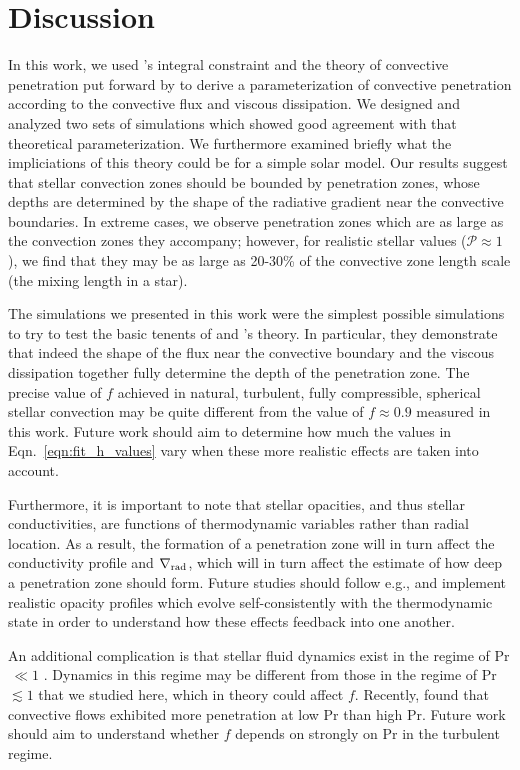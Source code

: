 \documentclass{aastex631}
\newcommand{\gradrad}{\ensuremath{\nabla_{\rm{rad}}}}
\newcommand{\mP}{\ensuremath{\mathcal{P}}}
\newcommand\Pran{\ensuremath{\mathrm{Pr}}}
\begin{document}
\section{Discussion}
\label{sec:discussion}
In this work, we used \citet{roxburgh1989}'s integral constraint and the theory of convective penetration put forward by \citet{zahn1991} to derive a parameterization of convective penetration according to the convective flux and viscous dissipation.
We designed and analyzed two sets of simulations which showed good agreement with that theoretical parameterization.
We furthermore examined briefly what the impliciations of this theory could be for a simple solar model.
Our results suggest that stellar convection zones should be bounded by penetration zones, whose depths are determined by the shape of the radiative gradient near the convective boundaries.
In extreme cases, we observe penetration zones which are as large as the convection zones they accompany; however, for realistic stellar values ($\mP \approx 1$), we find that they may be as large as 20-30\% of the convective zone length scale (the mixing length in a star).

The simulations we presented in this work were the simplest possible simulations to try to test the basic tenents of \citet{roxburgh1989} and \citet{zahn1991}'s theory.
In particular, they demonstrate that indeed the shape of the flux near the convective boundary and the viscous dissipation together fully determine the depth of the penetration zone.
The precise value of $f$ achieved in natural, turbulent, fully compressible, spherical stellar convection may be quite different from the value of $f \approx 0.9$ measured in this work.
Future work should aim to determine how much the values in Eqn.~\ref{eqn:fit_h_values} vary when these more realistic effects are taken into account.

Furthermore, it is important to note that stellar opacities, and thus stellar conductivities, are functions of thermodynamic variables rather than radial location.
As a result, the formation of a penetration zone will in turn affect the conductivity profile and $\gradrad$, which will in turn affect the estimate of how deep a penetration zone should form.
Future studies should follow e.g., \citet{kapyla_etal_2017} and implement realistic opacity profiles which evolve self-consistently with the thermodynamic state in order to understand how these effects feedback into one another.

An additional complication is that stellar fluid dynamics exist in the regime of Pr$\,\ll1$ \citep{garaud2021}.
Dynamics in this regime may be different from those in the regime of Pr $\lesssim 1$ that we studied here, which in theory could affect $f$.
Recently, \citet{kapyla2021} found that convective flows exhibited more penetration at low Pr than high Pr.
Future work should aim to understand whether $f$ depends on strongly on $\Pran$ in the turbulent regime.
\end{document}
